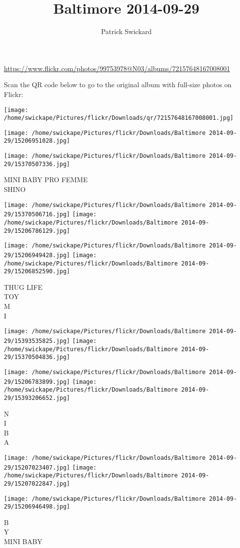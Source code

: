 \documentclass[10pt,letterpaper]{article}
\title{Baltimore 2014-09-29}
\author{Patrick Swickard}
\date{}
\begin{document}
\maketitle

\url{https://www.flickr.com/photos/99753978@N03/albums/72157648167008001}

Scan the QR code below to go to the original album with full-size photos on Flickr:

\texttt{[image: /home/swickape/Pictures/flickr/Downloads/qr/72157648167008001.jpg]}
\pagebreak

\texttt{[image: /home/swickape/Pictures/flickr/Downloads/Baltimore 2014-09-29/15206951028.jpg]}

\vspace{0.25in}
\texttt{[image: /home/swickape/Pictures/flickr/Downloads/Baltimore 2014-09-29/15370507336.jpg]}

MINI BABY PRO FEMME\\
SHINO
\pagebreak

\texttt{[image: /home/swickape/Pictures/flickr/Downloads/Baltimore 2014-09-29/15370506716.jpg]}
\texttt{[image: /home/swickape/Pictures/flickr/Downloads/Baltimore 2014-09-29/15206786129.jpg]}

\texttt{[image: /home/swickape/Pictures/flickr/Downloads/Baltimore 2014-09-29/15206949428.jpg]}
\texttt{[image: /home/swickape/Pictures/flickr/Downloads/Baltimore 2014-09-29/15206852590.jpg]}

THUG LIFE\\
TOY\\
M\\
I
\pagebreak

\texttt{[image: /home/swickape/Pictures/flickr/Downloads/Baltimore 2014-09-29/15393535825.jpg]}
\texttt{[image: /home/swickape/Pictures/flickr/Downloads/Baltimore 2014-09-29/15370504836.jpg]}

\texttt{[image: /home/swickape/Pictures/flickr/Downloads/Baltimore 2014-09-29/15206783899.jpg]}
\texttt{[image: /home/swickape/Pictures/flickr/Downloads/Baltimore 2014-09-29/15393206652.jpg]}

N\\
I\\
B\\
A
\pagebreak

\texttt{[image: /home/swickape/Pictures/flickr/Downloads/Baltimore 2014-09-29/15207023407.jpg]}
\texttt{[image: /home/swickape/Pictures/flickr/Downloads/Baltimore 2014-09-29/15207022847.jpg]}

\vspace{0.25in}
\texttt{[image: /home/swickape/Pictures/flickr/Downloads/Baltimore 2014-09-29/15206946498.jpg]}

B\\
Y\\
MINI BABY
\pagebreak
\end{document}
